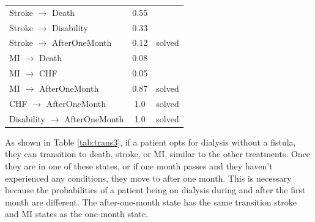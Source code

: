 \documentclass[10pt,twocolumn]{article}
\begin{document}
\begin{table}[ht]
\begin{tabularx}{\columnwidth}{X c c}
 Stroke \(\rightarrow\) Death & 0.55 & \cite{long-term} \\
 Stroke \(\rightarrow\) Disability & 0.33 & \cite{ckdmodel} \\
 Stroke \(\rightarrow\) AfterOneMonth & 0.12 & solved \\

 MI \(\rightarrow\) Death & 0.08 & \cite{ckdmodel} \\
 MI \(\rightarrow\) CHF & 0.05 & \cite{ckdmodel} \\
 MI \(\rightarrow\) AfterOneMonth & 0.87 & solved \\

 CHF \(\rightarrow\) AfterOneMonth & 1.0 & solved \\
 Disability \(\rightarrow\) AfterOneMonth & 1.0 & solved \\

      \bottomrule
  \end{tabularx}
\end{table}

As shown in Table \ref{tab:trans3}, if a patient opts for dialysis without a fistula, they can transition to death, stroke, or MI, similar to the other treatments. Once they are in one of these states, or if one month passes and they haven't experienced any conditions, they move to after one month. This is necessary because the probabilities of a patient being on dialysis during and after the first month are different. The after-one-month state has the same transition stroke and MI states as the one-month state.
\end{document}
